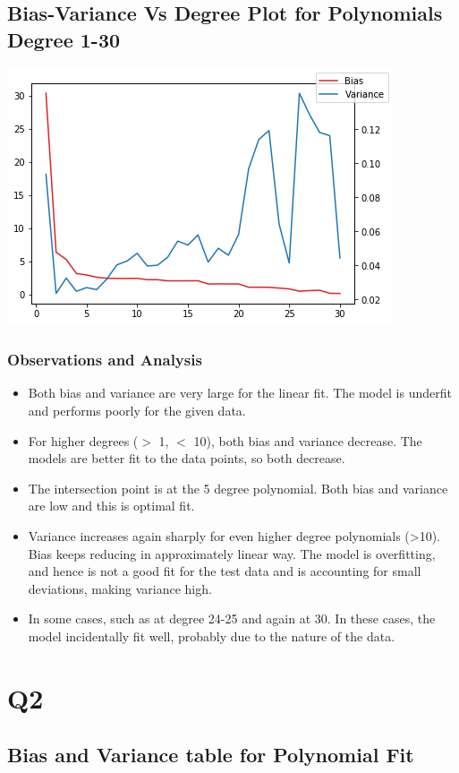\documentclass{article}
\begin{document}
\subsection{Bias-Variance Vs Degree Plot for Polynomials Degree 1-30}
\includegraphics[scale=.9]{images/1-30.png}
\subsubsection{Observations and Analysis}
\begin{itemize}
\item Both bias and variance are very large for the linear fit. The model is underfit and performs poorly for the given data.
\item For higher degrees ($>$ 1, $<$ 10), both bias and variance decrease. The models are better fit to the data points, so both decrease.
\item The intersection point is at the 5 degree polynomial. Both bias and variance are low and this is optimal fit.
\item Variance increases again sharply for even higher degree polynomials (>10). Bias keeps reducing in approximately linear way. The model is overfitting, and hence is not a good fit for the test data and is accounting for small deviations, making variance high. 
\item In some cases, such as at degree 24-25 and again at 30. In these cases, the model incidentally fit well, probably due to the nature of the data.
\end{itemize}

\section{Q2}
\subsection{Bias and Variance table for Polynomial Fit}
\end{document}

